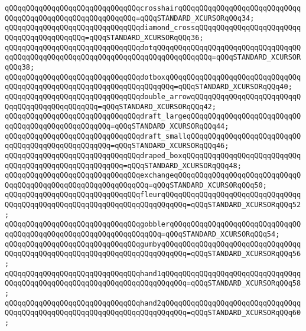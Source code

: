 \verb|qQQqqQQqqQQqqQQqqQQqqQQqqQQqqQQqcrosshairqQQqqQQqqQQqqQQqqQQqqQQqqQQqqQQqqQQqqQQqqQQqqQQqqQQqqQQqqQQq=qQQqSTANDARD_XCURSORqQQq34;|\newline
\verb|qQQqqQQqqQQqqQQqqQQqqQQqqQQqqQQqdiamond_crossqQQqqQQqqQQqqQQqqQQqqQQqqQQqqQQqqQQqqQQqqQQq=qQQqSTANDARD_XCURSORqQQq36;|\newline
\verb|qQQqqQQqqQQqqQQqqQQqqQQqqQQqqQQqdotqQQqqQQqqQQqqQQqqQQqqQQqqQQqqQQqqQQqqQQqqQQqqQQqqQQqqQQqqQQqqQQqqQQqqQQqqQQqqQQqqQQq=qQQqSTANDARD_XCURSORqQQq38;|\newline
\verb|qQQqqQQqqQQqqQQqqQQqqQQqqQQqqQQqdotboxqQQqqQQqqQQqqQQqqQQqqQQqqQQqqQQqqQQqqQQqqQQqqQQqqQQqqQQqqQQqqQQqqQQqqQQq=qQQqSTANDARD_XCURSORqQQq40;|\newline
\verb|qQQqqQQqqQQqqQQqqQQqqQQqqQQqqQQqdouble_arrowqQQqqQQqqQQqqQQqqQQqqQQqqQQqqQQqqQQqqQQqqQQqqQQq=qQQqSTANDARD_XCURSORqQQq42;|\newline
\verb|qQQqqQQqqQQqqQQqqQQqqQQqqQQqqQQqdraft_largeqQQqqQQqqQQqqQQqqQQqqQQqqQQqqQQqqQQqqQQqqQQqqQQqqQQq=qQQqSTANDARD_XCURSORqQQq44;|\newline
\verb|qQQqqQQqqQQqqQQqqQQqqQQqqQQqqQQqdraft_smallqQQqqQQqqQQqqQQqqQQqqQQqqQQqqQQqqQQqqQQqqQQqqQQqqQQq=qQQqSTANDARD_XCURSORqQQq46;|\newline
\verb|qQQqqQQqqQQqqQQqqQQqqQQqqQQqqQQqdraped_boxqQQqqQQqqQQqqQQqqQQqqQQqqQQqqQQqqQQqqQQqqQQqqQQqqQQqqQQq=qQQqSTANDARD_XCURSORqQQq48;|\newline
\verb|qQQqqQQqqQQqqQQqqQQqqQQqqQQqqQQqexchangeqQQqqQQqqQQqqQQqqQQqqQQqqQQqqQQqqQQqqQQqqQQqqQQqqQQqqQQqqQQqqQQq=qQQqSTANDARD_XCURSORqQQq50;|\newline
\verb|qQQqqQQqqQQqqQQqqQQqqQQqqQQqqQQqfleurqQQqqQQqqQQqqQQqqQQqqQQqqQQqqQQqqQQqqQQqqQQqqQQqqQQqqQQqqQQqqQQqqQQqqQQqqQQq=qQQqSTANDARD_XCURSORqQQq52;|\newline
\verb|qQQqqQQqqQQqqQQqqQQqqQQqqQQqqQQqgobblerqQQqqQQqqQQqqQQqqQQqqQQqqQQqqQQqqQQqqQQqqQQqqQQqqQQqqQQqqQQqqQQqqQQq=qQQqSTANDARD_XCURSORqQQq54;|\newline
\verb|qQQqqQQqqQQqqQQqqQQqqQQqqQQqqQQqgumbyqQQqqQQqqQQqqQQqqQQqqQQqqQQqqQQqqQQqqQQqqQQqqQQqqQQqqQQqqQQqqQQqqQQqqQQqqQQq=qQQqSTANDARD_XCURSORqQQq56;|\newline
\verb|qQQqqQQqqQQqqQQqqQQqqQQqqQQqqQQqhand1qQQqqQQqqQQqqQQqqQQqqQQqqQQqqQQqqQQqqQQqqQQqqQQqqQQqqQQqqQQqqQQqqQQqqQQqqQQq=qQQqSTANDARD_XCURSORqQQq58;|\newline
\verb|qQQqqQQqqQQqqQQqqQQqqQQqqQQqqQQqhand2qQQqqQQqqQQqqQQqqQQqqQQqqQQqqQQqqQQqqQQqqQQqqQQqqQQqqQQqqQQqqQQqqQQqqQQqqQQq=qQQqSTANDARD_XCURSORqQQq60;|\newline
